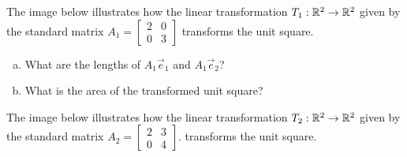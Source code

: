 \begin{applicationActivities}

\begin{activity}{5}
The image below illustrates how the linear transformation
$T_1 : \mathbb{R}^2 \rightarrow \mathbb{R}^2$ given by the
standard matrix $A_1 = \begin{bmatrix} 2 & 0 \\ 0 & 3 \end{bmatrix}$
transforms the unit square.

\begin{center}
\end{center}

\begin{enumerate}[(a)]
\item What are the lengths of \(A_1\vec e_1\) and \(A_1\vec e_2\)?
\item What is the area of the transformed unit square?
\end{enumerate}

\end{activity}


\begin{activity}{5}
The image below illustrates how the linear transformation
$T_2 : \mathbb{R}^2 \rightarrow \mathbb{R}^2$ given by the
standard matrix $A_2 = \begin{bmatrix} 2 & 3 \\ 0 & 4 \end{bmatrix}$.
transforms the unit square.


\end{activity}
\end{applicationActivities}
